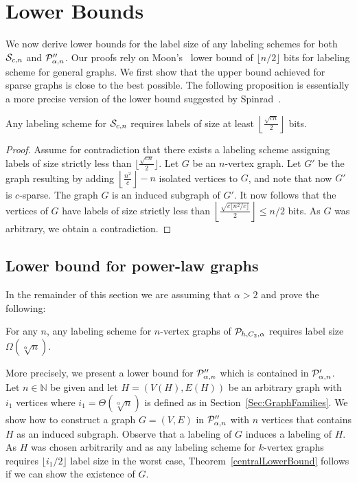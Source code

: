 
\section{Lower Bounds}
We now derive lower bounds for the label size of any  labeling schemes for both $ \mathcal{S}_{c,n}$ and  $ \mathcal{P}''_{\alpha,n}$.
Our proofs rely on  Moon's~\cite{moon1965minimal} lower bound of  $\lfloor n/2 \rfloor$ bits for labeling scheme for general graphs.
We first show that the upper bound achieved for sparse graphs is close to the best possible.
The following proposition is essentially a more precise version of the lower bound suggested by Spinrad~\cite{spinrad2003efficient}.
\begin{proposition}
Any  labeling scheme for $ \mathcal{S}_{c,n}$ requires  labels of size at least $\left\lfloor\frac{\sqrt{cn}}2\right\rfloor$ bits.
\end{proposition}
\begin{proof}
Assume for contradiction that there exists a labeling scheme  assigning labels of size strictly less than $\lfloor\frac{\sqrt{cn}}2\rfloor$.
Let $G$ be an $n$-vertex graph. Let $G'$ be the graph resulting by adding $\left\lfloor\frac{n^2}{c}\right\rfloor - n$ isolated vertices to $G$, and note that now $G'$ is $c$-sparse. The graph $G$ is an induced subgraph of  $G'$.
It now follows that the vertices of $G$ have  labels of size strictly less than 
$\left\lfloor\frac{\sqrt{c\lfloor n^2/c\rfloor}}2\right\rfloor \leq n/2$ bits. As $G$ was arbitrary, we obtain a contradiction.
\end{proof}

\subsection{Lower bound for power-law graphs}
In the remainder of this section we are assuming that $\alpha>2$ and  prove the following:
\begin{theorem}\label{centralLowerBound}
For any $n$, any labeling scheme for $n$-vertex graphs of $ \mathcal{P}_{h,C_2,\alpha}$ requires label size $\Omega(\sqrt[\alpha]{n})$.
\end{theorem}
More precisely, we present a lower bound for $ \mathcal{P}''_{\alpha,n}$ which is contained in $ \mathcal{P}'_{\alpha,n}$. Let $n\in\mathbb N$ be given and let $H = (V(H),E(H))$ be an arbitrary graph with $i_1$ vertices where $i_1 = \Theta(\sqrt[\alpha]n)$ is defined as in Section~\ref{Sec:GraphFamilies}. We show how to construct a graph $G = (V,E)$ in $ \mathcal{P}''_{\alpha,n}$ with $n$ vertices that contains $H$ as an induced subgraph. Observe that a labeling of $G$ induces a labeling of $H$. As $H$ was chosen arbitrarily and as any labeling scheme for $k$-vertex graphs requires $\lfloor i_1/2 \rfloor$ label size in the worst case, Theorem~\ref{centralLowerBound} follows if we can show the existence of $G$.

